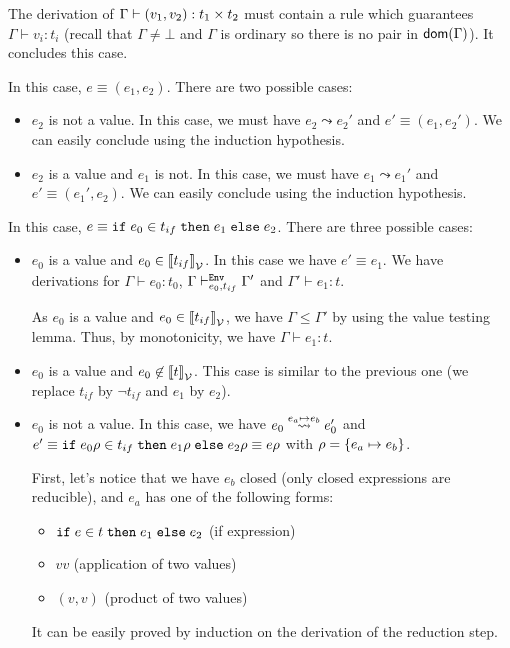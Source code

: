 \documentclass[a4paper]{article}
\theoremstyle{definition}
\begin{document}
\begin{description}
\begin{itemize}
            The derivation of $\Gamma \vdash (v_1,v_2): t_1\times t_2$ must contain a rule 
            which guarantees $\Gamma \vdash v_i: t_i$ (recall that $\Gamma \neq \bot$ and $\Gamma$ is ordinary so there is no pair in $\textsf{dom}(\Gamma)$).
            It concludes this case.
          \end{itemize} 
          \item[\Rule{Pair}] In this case, $e\equiv (e_1,e_2)$. There are two possible cases:
          \begin{itemize}
            \item $e_2$ is not a value. In this case, we must have $e_2\leadsto e_2'$
            and $e'\equiv (e_1, e_2')$. We can easily conclude using the induction hypothesis.
            \item $e_2$ is a value and $e_1$ is not. In this case, we must have $e_1\leadsto e_1'$
            and $e'\equiv (e_1', e_2)$. We can easily conclude using the induction hypothesis.
          \end{itemize}
          \item[\Rule{Case}] In this case, $e\equiv \texttt{if}\;e_0\in t_{if}\;\texttt{then}\;e_1\;\texttt{else}\;e_2$. There are three possible cases:
          \begin{itemize}
            \item $e_0$ is a value and $e_0 \in {\llbracket t_{if} \rrbracket}_{\mathcal{V}}$. In this case we have $e' \equiv e_1$.
            We have derivations for $\Gamma \vdash e_0: t_0$, $\Gamma \vdash^{\texttt{Env}}_{e_0,t_{if}} \Gamma'$ and $\Gamma'\vdash e_1:t$.
            
            As $e_0$ is a value and $e_0 \in {\llbracket t_{if} \rrbracket}_{\mathcal{V}}$, we have $\Gamma\leq\Gamma'$ by using the value testing lemma.
            Thus, by monotonicity, we have $\Gamma\vdash e_1:t$.
            \item $e_0$ is a value and $e_0 \not\in {\llbracket t \rrbracket}_{\mathcal{V}}$. This case is similar to the previous one (we replace $t_{if}$ by $\neg t_{if}$ and $e_1$ by $e_2$).
            \item $e_0$ is not a value.
            In this case, we have $e_0\overset{e_a\mapsto e_b}{\leadsto} e_0'$ and $e'\equiv \texttt{if}\;e_0\rho\in t_{if}\;\texttt{then}\;e_1\rho\;\texttt{else}\;e_2\rho\equiv e\rho$
            with $\rho = \{e_a \mapsto e_b\}$.
            
            First, let's notice that we have $e_b$ closed (only closed expressions are reducible),
            and $e_a$ has one of the following forms:
            \begin{itemize}
              \item $\texttt{if}\;e\in t\;\texttt{then}\;e_1\;\texttt{else}\;e_2$ (if expression)
              \item $v v$ (application of two values)
              \item $(v,v)$ (product of two values)
            \end{itemize}
            It can be easily proved by induction on the derivation of the reduction step.


\end{itemize}
\end{description}
\end{document}
